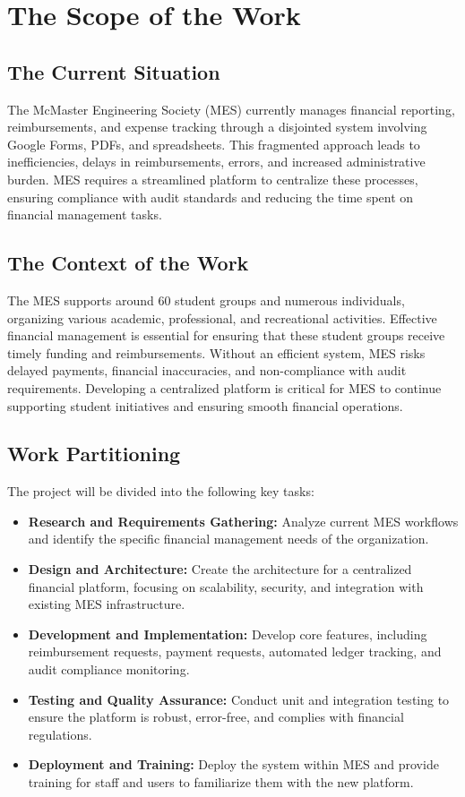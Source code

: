 \documentclass[12pt]{article}
\begin{document}
\section{The Scope of the Work}

\subsection{The Current Situation}
The McMaster Engineering Society (MES) currently manages financial reporting, reimbursements, and expense tracking through a disjointed system involving Google Forms, PDFs, and spreadsheets. This fragmented approach leads to inefficiencies, delays in reimbursements, errors, and increased administrative burden. MES requires a streamlined platform to centralize these processes, ensuring compliance with audit standards and reducing the time spent on financial management tasks.

\subsection{The Context of the Work}
The MES supports around 60 student groups and numerous individuals, organizing various academic, professional, and recreational activities. Effective financial management is essential for ensuring that these student groups receive timely funding and reimbursements. Without an efficient system, MES risks delayed payments, financial inaccuracies, and non-compliance with audit requirements. Developing a centralized platform is critical for MES to continue supporting student initiatives and ensuring smooth financial operations.

\subsection{Work Partitioning}
The project will be divided into the following key tasks:
\begin{itemize}
    \item \textbf{Research and Requirements Gathering:} Analyze current MES workflows and identify the specific financial management needs of the organization.
    \item \textbf{Design and Architecture:} Create the architecture for a centralized financial platform, focusing on scalability, security, and integration with existing MES infrastructure.
    \item \textbf{Development and Implementation:} Develop core features, including reimbursement requests, payment requests, automated ledger tracking, and audit compliance monitoring.
    \item \textbf{Testing and Quality Assurance:} Conduct unit and integration testing to ensure the platform is robust, error-free, and complies with financial regulations.
    \item \textbf{Deployment and Training:} Deploy the system within MES and provide training for staff and users to familiarize them with the new platform.
\end{itemize}
\end{document}
